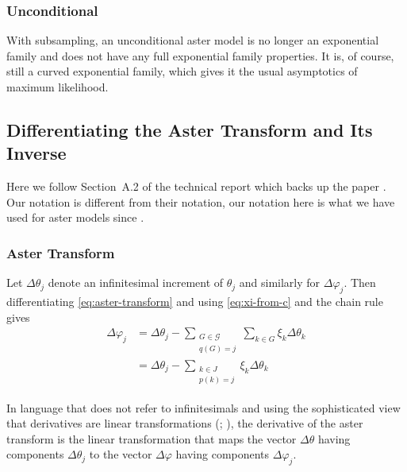 \subsubsection{Unconditional}

With subsampling, an unconditional aster model is no longer an exponential
family and does not have any full exponential family properties.
It is, of course, still a curved exponential family, which gives it
the usual asymptotics of maximum likelihood.

\subsection{Differentiating the Aster Transform and Its Inverse}
\label{sec:aster-transform-deriv}

Here we follow Section~A.2 of the technical report \citet{aster1-tr} which
backs up the paper \citet{aster1}.  Our notation is different from their
notation, our notation here is what we have used for aster models since
\citet{aster-philosophical}.

\subsubsection{Aster Transform}

Let $\Delta \theta_j$ denote an infinitesimal increment of $\theta_j$
and similarly for $\Delta \varphi_j$.  Then
differentiating \eqref{eq:aster-transform} and using \eqref{eq:xi-from-c} and
the chain rule gives
\begin{equation} \label{eq:aster-transform-deriv}
\begin{split}
   \Delta \varphi_j
   & =
   \Delta \theta_j
   -
   \sum_{\substack{G \in \mathcal{G} \\ q(G) = j}} \sum_{k \in G}
   \xi_k \Delta \theta_k
   \\
   & =
   \Delta \theta_j
   -
   \sum_{\substack{k \in J \\ p(k) = j}}
   \xi_k \Delta \theta_k
\end{split}
\end{equation}

In language that does not refer to infinitesimals and using the
sophisticated view that derivatives are linear transformations
(\citealp[Definition~8.9]{browder}; \citealp[p.~334]{lang}),
 the derivative of the
aster transform is the linear transformation that maps
the vector $\Delta \theta$ having components $\Delta \theta_j$ to
the vector $\Delta \varphi$ having components $\Delta \varphi_j$.

